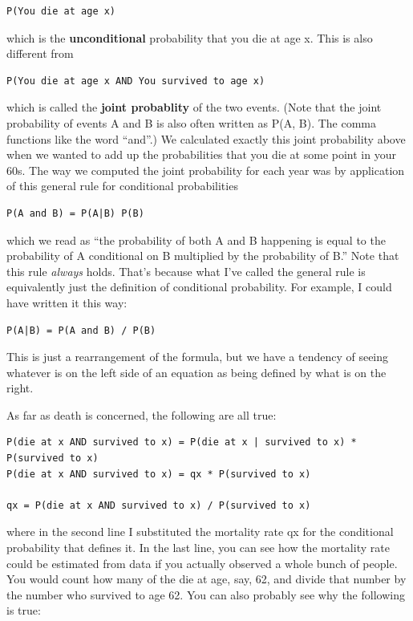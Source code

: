 \documentclass[openany]{book}
\begin{document}
\begin{verbatim}
P(You die at age x)
\end{verbatim}

which is the \textbf{unconditional} probability that you die at age x. This is also different from

\begin{verbatim}
P(You die at age x AND You survived to age x)
\end{verbatim}

which is called the \textbf{joint probablity} of the two events. (Note that the joint probability of events A and B is also often written as P(A, B). The comma functions like the word ``and''.) We calculated exactly this joint probability above when we wanted to add up the probabilities that you die at some point in your 60s. The way we computed the joint probability for each year was by application of this general rule for conditional probabilities

\begin{verbatim}
P(A and B) = P(A|B) P(B)
\end{verbatim}

which we read as ``the probability of both A and B happening is equal to the probability of A conditional on B multiplied by the probability of B.'' Note that this rule \emph{always} holds. That's because what I've called the general rule is equivalently just the definition of conditional probability. For example, I could have written it this way:

\begin{verbatim}
P(A|B) = P(A and B) / P(B)
\end{verbatim}

This is just a rearrangement of the formula, but we have a tendency of seeing whatever is on the left side of an equation as being defined by what is on the right.

As far as death is concerned, the following are all true:

\begin{verbatim}
P(die at x AND survived to x) = P(die at x | survived to x) * P(survived to x)
P(die at x AND survived to x) = qx * P(survived to x)

qx = P(die at x AND survived to x) / P(survived to x)
\end{verbatim}

where in the second line I substituted the mortality rate qx for the conditional probability that defines it. In the last line, you can see how the mortality rate could be estimated from data if you actually observed a whole bunch of people. You would count how many of the die at age, say, 62, and divide that number by the number who survived to age 62. You can also probably see why the following is true:
\end{document}
